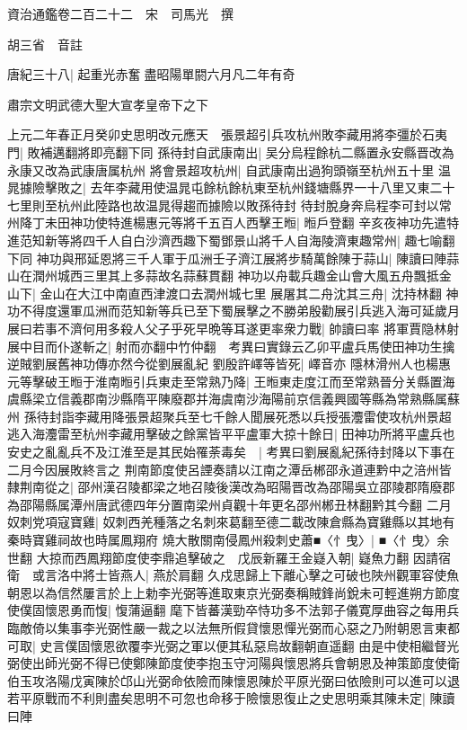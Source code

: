 資治通鑑卷二百二十二　宋　司馬光　撰

胡三省　音註

唐紀三十八|{
	起重光赤奮盡昭陽單閼六月凡二年有奇}


肅宗文明武德大聖大宣孝皇帝下之下

上元二年春正月癸卯史思明改元應天　張景超引兵攻杭州敗李藏用將李彊於石夷門|{
	敗補邁翻將即亮翻下同}
孫待封自武康南出|{
	吴分烏程餘杭二縣置永安縣晋改為永康又改為武康唐属杭州}
將會景超攻杭州|{
	自武康南出過狗頭嶺至杭州五十里}
温晁據險擊敗之|{
	去年李藏用使温晁屯餘杭餘杭東至杭州錢塘縣界一十八里又東二十七里則至杭州此陸路也故温晁得趨而據險以敗孫待封}
待封脫身奔烏程李可封以常州降丁未田神功使特進楊惠元等將千五百人西擊王暅|{
	暅戶登翻}
辛亥夜神功先遣特進范知新等將四千人自白沙濟西趣下蜀鄧景山將千人自海陵濟東趣常州|{
	趣七喻翻下同}
神功與邢延恩將三千人軍于瓜洲壬子濟江展將步騎萬餘陳于蒜山|{
	陳讀曰陣蒜山在潤州城西三里其上多蒜故名蒜蘇貫翻}
神功以舟載兵趣金山會大風五舟飄抵金山下|{
	金山在大江中南直西津渡口去潤州城七里}
展屠其二舟沈其三舟|{
	沈持林翻}
神功不得度還軍瓜洲而范知新等兵已至下蜀展擊之不勝弟殷勸展引兵逃入海可延歲月展曰若事不濟何用多殺人父子乎死早晩等耳遂更率衆力戰|{
	帥讀曰率}
將軍賈隐林射展中目而仆遂斬之|{
	射而亦翻中竹仲翻　考異曰實錄云乙卯平盧兵馬使田神功生擒逆賊劉展舊神功傳亦然今從劉展亂紀}
劉殷許嶧等皆死|{
	嶧音亦}
隱林滑州人也楊惠元等擊破王暅于淮南暅引兵東走至常熟乃降|{
	王暅東走度江而至常熟晉分关縣置海虞縣梁立信義郡南沙縣隋平陳廢郡并海虞南沙海陽前京信義興國等縣為常熟縣属蘇州}
孫待封詣李藏用降張景超聚兵至七千餘人聞展死悉以兵授張灋雷使攻杭州景超逃入海灋雷至杭州李藏用擊破之餘黨皆平平盧軍大掠十餘日|{
	田神功所將平盧兵也}
安史之亂亂兵不及江淮至是其民始罹荼毒矣　|{
	考異曰劉展亂紀孫待封降以下事在二月今因展敗終言之}
荆南節度使呂諲奏請以江南之潭岳郴邵永道連黔中之涪州皆隸荆南從之|{
	邵州漢召陵都梁之地召陵後漢改為昭陽晋改為邵陽吳立邵陵郡隋廢郡為邵陽縣属潭州唐武德四年分置南梁州貞觀十年更名邵州郴丑林翻黔其今翻}
二月奴刺党項寇寶雞|{
	奴刺西羌種落之名刺來葛翻至德二載改陳倉縣為寶雞縣以其地有秦時寶雞祠故也時属鳳翔府}
燒大散關南侵鳳州殺刺史蕭■〈忄曳〉|{
	■〈忄曳〉余世翻}
大掠而西鳳翔節度使李鼎追擊破之　戊辰新羅王金嶷入朝|{
	嶷魚力翻}
因請宿衛　或言洛中將士皆燕人|{
	燕於肩翻}
久戍思歸上下離心擊之可破也陜州觀軍容使魚朝恩以為信然屢言於上上勅李光弼等進取東京光弼奏稱賊鋒尚銳未可輕進朔方節度使僕固懷恩勇而愎|{
	愎蒲逼翻}
麾下皆蕃漢勁卒恃功多不法郭子儀寛厚曲容之每用兵臨敵倚以集事李光弼性嚴一裁之以法無所假貸懷恩憚光弼而心惡之乃附朝恩言東都可取|{
	史言僕固懷恩欲覆李光弼之軍以便其私惡烏故翻朝直遥翻}
由是中使相繼督光弼使出師光弼不得已使鄭陳節度使李抱玉守河陽與懷恩將兵會朝恩及神策節度使衛伯玉攻洛陽戊寅陳於邙山光弼命依險而陳懷恩陳於平原光弼曰依險則可以進可以退若平原戰而不利則盡矣思明不可忽也命移于險懷恩復止之史思明乘其陳未定|{
	陳讀曰陣}

